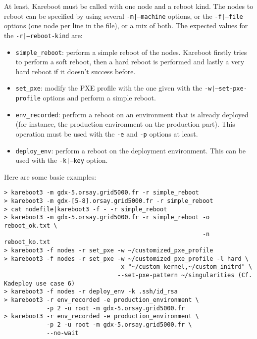 \documentclass[a4wide,10pt,oneside]{book}
\begin{document}
At least, Kareboot must be called with one node and a reboot kind. The nodes to reboot can be specified by using several \texttt{-m|--machine} options, or the \texttt{-f|--file} options (one node per line in the file), or a mix of both. The expected values for the \texttt{-r|--reboot-kind} are:
\begin{itemize}
\item \texttt{simple\_reboot}: perform a simple reboot of the nodes. Kareboot firstly tries to perform a soft reboot, then a hard reboot is performed and lastly a very hard reboot if it doesn't success before.
\item \texttt{set\_pxe}: modify the PXE profile with the one given with the \texttt{-w|--set-pxe-profile} options and perform a simple reboot.
\item \texttt{env\_recorded}: perform a reboot on an environment that is already deployed (for instance, the production environment on the production part). This operation must be used with the \texttt{-e} and \texttt{-p} options at least.
\item \texttt{deploy\_env}: perform a reboot on the deployment environment. This can be used with the \texttt{-k|--key} option.
\end{itemize}

Here are some basic examples:
\begin{verbatim}
> kareboot3 -m gdx-5.orsay.grid5000.fr -r simple_reboot
> kareboot3 -m gdx-[5-8].orsay.grid5000.fr -r simple_reboot
> cat nodefile|kareboot3 -f - -r simple_reboot
> kareboot3 -m gdx-5.orsay.grid5000.fr -r simple_reboot -o reboot_ok.txt \
                                                        -n reboot_ko.txt
> kareboot3 -f nodes -r set_pxe -w ~/customized_pxe_profile
> kareboot3 -f nodes -r set_pxe -w ~/customized_pxe_profile -l hard \
                                -x "~/custom_kernel,~/custom_initrd" \
                                --set-pxe-pattern ~/singularities (Cf. Kadeploy use case 6)
> kareboot3 -f nodes -r deploy_env -k .ssh/id_rsa
> kareboot3 -r env_recorded -e production_environment \
            -p 2 -u root -m gdx-5.orsay.grid5000.fr
> kareboot3 -r env_recorded -e production_environment \
            -p 2 -u root -m gdx-5.orsay.grid5000.fr \
            --no-wait
\end{verbatim}
\end{document}
